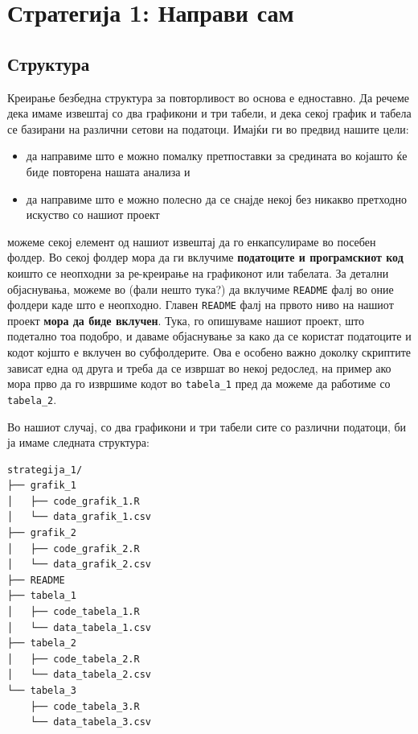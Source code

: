 \documentclass[
]{book}
\providecommand{\tightlist}{%
  \setlength{\itemsep}{0pt}\setlength{\parskip}{0pt}}
\begin{document}
\hypertarget{ux441ux442ux440ux430ux442ux435ux433ux438ux458ux430-1-ux43dux430ux43fux440ux430ux432ux438-ux441ux430ux43c}{%
\section{Стратегија 1: Направи сам}\label{ux441ux442ux440ux430ux442ux435ux433ux438ux458ux430-1-ux43dux430ux43fux440ux430ux432ux438-ux441ux430ux43c}}

\hypertarget{ux441ux442ux440ux443ux43aux442ux443ux440ux430}{%
\subsection{Структура}\label{ux441ux442ux440ux443ux43aux442ux443ux440ux430}}

Креирање безбедна структура за повторливост во основа е едноставно. Да речеме дека имаме извештај со два графикони и три табели, и дека секој график и табела се базирани на различни сетови на податоци. Имајќи ги во предвид нашите цели:

\begin{itemize}
\tightlist
\item
  да направиме што е можно помалку претпоставки за средината во којашто ќе биде повторена нашата анализа и\\
\item
  да направиме што е можно полесно да се снајде некој без никакво претходно искуство со нашиот проект
\end{itemize}

можеме секој елемент од нашиот извештај да го енкапсулираме во посебен фолдер. Во секој фолдер мора да ги вклучиме \textbf{податоците и програмскиот код} коишто се неопходни за ре-креирање на графиконот или табелата. За детални објаснувања, можеме во (фали нешто тука?) да вклучиме \texttt{README} фалј во оние фолдери каде што е неопходно. Главен \texttt{README} фалј на првото ниво на нашиот проект \textbf{мора да биде вклучен}. Тука, го опишуваме нашиот проект, што подетално тоа подобро, и даваме објаснување за како да се користат податоците и кодот којшто е вклучен во субфолдерите. Ова е особено важно доколку скриптите зависат една од друга и треба да се извршат во некој редослед, на пример ако мора прво да го извршиме кодот во \texttt{tabela\_1} пред да можеме да работиме со \texttt{tabela\_2}.

Во нашиот случај, со два графикони и три табели сите со различни податоци, би ја имаме следната структура:

\begin{verbatim}
strategija_1/
├── grafik_1
│   ├── code_grafik_1.R
│   └── data_grafik_1.csv
├── grafik_2
│   ├── code_grafik_2.R
│   └── data_grafik_2.csv
├── README
├── tabela_1
│   ├── code_tabela_1.R
│   └── data_tabela_1.csv
├── tabela_2
│   ├── code_tabela_2.R
│   └── data_tabela_2.csv
└── tabela_3
    ├── code_tabela_3.R
    └── data_tabela_3.csv
\end{verbatim}
\end{document}
